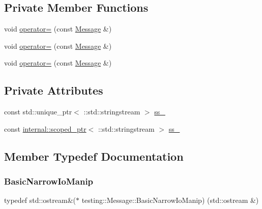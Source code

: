 \subsection*{Private Member Functions}
\begin{DoxyCompactItemize}
\item 
void \mbox{\hyperlink{classtesting_1_1_message_a5a0462b539ffb88f15ea0c67977774af}{operator=}} (const \mbox{\hyperlink{classtesting_1_1_message}{Message}} \&)
\item 
void \mbox{\hyperlink{classtesting_1_1_message_a5a0462b539ffb88f15ea0c67977774af}{operator=}} (const \mbox{\hyperlink{classtesting_1_1_message}{Message}} \&)
\item 
void \mbox{\hyperlink{classtesting_1_1_message_a5a0462b539ffb88f15ea0c67977774af}{operator=}} (const \mbox{\hyperlink{classtesting_1_1_message}{Message}} \&)
\end{DoxyCompactItemize}
\subsection*{Private Attributes}
\begin{DoxyCompactItemize}
\item 
const std\+::unique\+\_\+ptr$<$ \+::std\+::stringstream $>$ \mbox{\hyperlink{classtesting_1_1_message_a26c06d7152809e675676bbbb0cc56bfa}{ss\+\_\+}}
\item 
const \mbox{\hyperlink{classtesting_1_1internal_1_1scoped__ptr}{internal\+::scoped\+\_\+ptr}}$<$ \+::std\+::stringstream $>$ \mbox{\hyperlink{classtesting_1_1_message_ad46fbddd62cde8526744ae32e3322b76}{ss\+\_\+}}
\end{DoxyCompactItemize}


\subsection{Member Typedef Documentation}
\mbox{\label{classtesting_1_1_message_ad398b70e2a11b923cef05c809b0eeb92}} 
\subsubsection{\texorpdfstring{BasicNarrowIoManip}{BasicNarrowIoManip}\hspace{0.1cm}{\footnotesize\ttfamily [1/3]}}
{\footnotesize\ttfamily typedef std\+::ostream\&($\ast$ testing\+::\+Message\+::\+Basic\+Narrow\+Io\+Manip) (std\+::ostream \&)\hspace{0.3cm}{\ttfamily [private]}}

